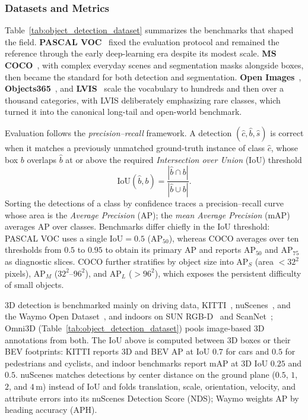 



\subsubsection{Datasets and Metrics}
Table~\ref{tab:object_detection_dataset} summarizes the benchmarks that shaped the field. \textbf{PASCAL VOC}~\cite{everingham2010pascal} fixed the evaluation protocol and remained the reference through the early deep-learning era despite its modest scale. \textbf{MS COCO}~\cite{lin2014microsoft}, with complex everyday scenes and segmentation masks alongside boxes, then became the standard for both detection and segmentation. \textbf{Open Images}~\cite{kuznetsova2020open}, \textbf{Objects365}~\cite{shao2019objects365}, and \textbf{LVIS}~\cite{gupta2019lvis} scale the vocabulary to hundreds and then over a thousand categories, with LVIS deliberately emphasizing rare classes, which turned it into the canonical long-tail and open-world benchmark.

Evaluation follows the \emph{precision--recall} framework. A detection $(\hat{c}, \hat{b}, \hat{s})$ is correct when it matches a previously unmatched ground-truth instance of class $\hat{c}$, whose box $b$ overlaps $\hat{b}$ at or above the required \emph{Intersection over Union} (IoU) threshold
\begin{equation}
\mathrm{IoU}(\hat{b}, b) = \frac{|\hat{b} \cap b|}{|\hat{b} \cup b|}.
\end{equation}
Sorting the detections of a class by confidence traces a precision--recall curve whose area is the \emph{Average Precision} (AP); the \emph{mean Average Precision} (mAP) averages AP over classes. Benchmarks differ chiefly in the IoU threshold: PASCAL VOC uses a single $\mathrm{IoU} = 0.5$ (AP$_{50}$), whereas COCO averages over ten thresholds from $0.5$ to $0.95$ to obtain its primary AP and reports AP$_{50}$ and AP$_{75}$ as diagnostic slices. COCO further stratifies by object size into AP$_S$ (area $<32^2$ pixels), AP$_M$ ($32^2$--$96^2$), and AP$_L$ ($>96^2$), which exposes the persistent difficulty of small objects.

3D detection is benchmarked mainly on driving data, KITTI~\cite{KITTI-GeigerLU12}, nuScenes~\cite{caesar2020nuscenes}, and the Waymo Open Dataset~\cite{WaymoOpen-SunKDCPTGZCCVHN20}, and indoors on SUN RGB-D~\cite{song2015sunrgbd} and ScanNet~\cite{dai2017scannet}; Omni3D (Table~\ref{tab:object_detection_dataset}) pools image-based 3D annotations from both. The IoU above is computed between 3D boxes or their BEV footprints: KITTI reports 3D and BEV AP at IoU $0.7$ for cars and $0.5$ for pedestrians and cyclists, and indoor benchmarks report mAP at 3D IoU $0.25$ and $0.5$. nuScenes matches detections by center distance on the ground plane ($0.5$, $1$, $2$, and $4$\,m) instead of IoU and folds translation, scale, orientation, velocity, and attribute errors into its nuScenes Detection Score (NDS); Waymo weights AP by heading accuracy (APH).

